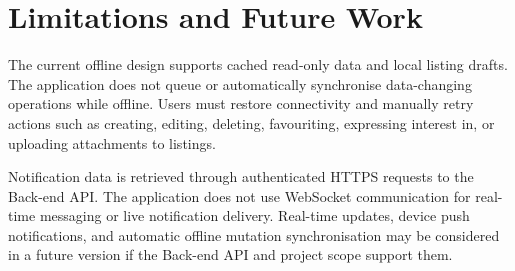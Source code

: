 \section{Limitations and Future Work}
\label{sec:limitations}

The current offline design supports cached read-only data and local listing drafts.
The application does not queue or automatically synchronise data-changing operations while offline.
Users must restore connectivity and manually retry actions such as creating, editing, deleting, favouriting, expressing interest in, or uploading attachments to listings.

Notification data is retrieved through authenticated HTTPS requests to the \tradesq{} Back-end API.
The application does not use WebSocket communication for real-time messaging or live notification delivery.
Real-time updates, device push notifications, and automatic offline mutation synchronisation may be considered in a future version if the Back-end API and project scope support them.
